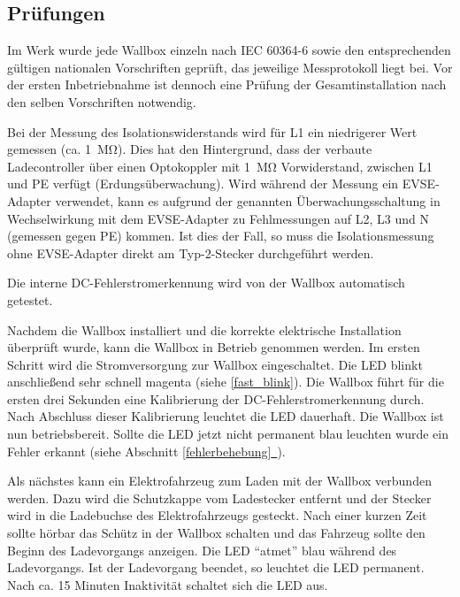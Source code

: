 \documentclass[a4paper,10pt]{article}
\newcommand*{\fullref}[1]{Abschnitt \hyperref[{#1}]{\ref*{#1}~\nameref*{#1}}}
\begin{document}
\begin{multicols*}{2}
    \vspace{-0.2cm}
    \subsection{Prüfungen}\label{tests}
    \vspace{-0.1cm}
    Im Werk wurde jede Wallbox einzeln nach IEC 60364-6 sowie den entsprechenden gültigen
    nationalen Vorschriften geprüft, das jeweilige Messprotokoll liegt bei.
    Vor der ersten Inbetriebnahme ist dennoch eine Prüfung der Gesamtinstallation
    nach den selben Vorschriften notwendig.

    Bei der Messung des Isolationswiderstands wird für L1 ein niedrigerer Wert
    gemessen (ca. \SI{1}{\mega\ohm}). Dies hat den Hintergrund, dass
    der verbaute Ladecontroller über einen Optokoppler mit
    \SI{1}{\mega\ohm} Vorwiderstand, zwischen L1 und
    PE verfügt (Erdungsüberwachung). Wird während der Messung ein EVSE-Adapter verwendet,
    kann es aufgrund der genannten Überwachungsschaltung in Wechselwirkung mit dem EVSE-Adapter zu Fehlmessungen
    auf L2, L3 und N (gemessen gegen PE) kommen. Ist dies der Fall, so muss die Isolationsmessung
    ohne EVSE-Adapter direkt am Typ-2-Stecker durchgeführt werden.

    Die interne DC-Fehlerstromerkennung wird von der Wallbox automatisch getestet.

    Nachdem die Wallbox installiert
    und die korrekte elektrische Installation überprüft wurde, kann die Wallbox in
    Betrieb genommen werden.
    Im ersten Schritt wird die Stromversorgung zur Wallbox eingeschaltet. Die
    LED blinkt anschließend sehr schnell magenta (siehe \ref{fast_blink}). Die Wallbox führt
    für die ersten drei Sekunden eine Kalibrierung der
    DC-Fehlerstromerkennung durch. Nach Abschluss dieser Kalibrierung
    leuchtet die LED dauerhaft. Die Wallbox ist nun betriebsbereit. Sollte die LED jetzt
    nicht permanent blau leuchten wurde ein Fehler erkannt (siehe \fullref{fehlerbehebung}).

    Als nächstes kann ein Elektrofahrzeug zum Laden mit der Wallbox verbunden
    werden. Dazu wird die Schutzkappe vom Ladestecker entfernt und der Stecker
	wird in die Ladebuchse des Elektrofahrzeugs gesteckt. Nach einer kurzen Zeit sollte hörbar
    das Schütz in der Wallbox schalten und das Fahrzeug sollte den Beginn
    des Ladevorgangs anzeigen. Die LED \enquote{atmet} blau während des
    Ladevorgangs. Ist der Ladevorgang beendet, so leuchtet die LED permanent. Nach ca.
    15 Minuten Inaktivität schaltet sich die LED aus.


\end{multicols*}
\end{document}
